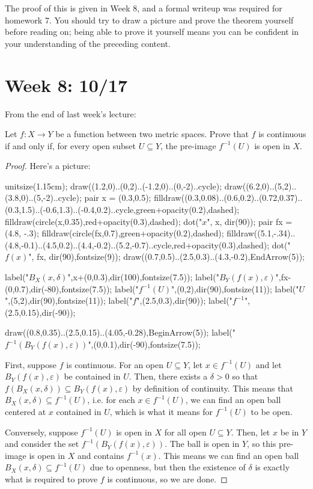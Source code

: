 \documentclass[10pt]{scrartcl}
\providecommand{\eps}{\varepsilon}
\providecommand{\inv}{^{-1}}
\begin{document}
The proof of this is given in Week 8,
and a formal writeup was required for homework 7.
You should try to draw a picture and prove the theorem yourself
before reading on; being able to prove it yourself
means you can be confident in your understanding of the preceding content.

\section{Week 8: 10/17}
From the end of last week's lecture:
\begin{theorem}
	\label{wk8:thm:topocont}
	Let $f\colon X\to Y$ be a function between two metric spaces.
	Prove that $f$ is continuous if and only if,
	for every open subset $U\subseteq Y$, the pre-image
	$f\inv(U)$ is open in $X$.
\end{theorem}

\begin{proof}
	Here's a picture:
	\begin{center}
		\begin{asy}
		unitsize(1.15cm);
		draw((1.2,0)..(0,2)..(-1.2,0)..(0,-2)..cycle);
		draw((6.2,0)..(5,2)..(3.8,0)..(5,-2)..cycle);
		pair x = (0.3,0.5);
		filldraw((0.3,0.08)..(0.6,0.2)..(0.72,0.37)..(0.3,1.5)..(-0.6,1.3)..(-0.4,0.2)..cycle,green+opacity(0.2),dashed);
		filldraw(circle(x,0.35),red+opacity(0.3),dashed);
		dot("$x$", x, dir(90));
		pair fx = (4.8, -.3);
		filldraw(circle(fx,0.7),green+opacity(0.2),dashed);
		filldraw((5.1,-.34)..(4.8,-0.1)..(4.5,0.2)..(4.4,-0.2)..(5.2,-0.7)..cycle,red+opacity(0.3),dashed);
		dot("$f(x)$", fx, dir(90),fontsize(9));
		draw((0.7,0.5)..(2.5,0.3)..(4.3,-0.2),EndArrow(5));
		
		label("$B_X(x,\delta)$",x+(0,0.3),dir(100),fontsize(7.5));
		label("$B_Y(f(x),\varepsilon)$",fx-(0,0.7),dir(-80),fontsize(7.5));
		label("$f^{-1}(U)$",(0,2),dir(90),fontsize(11));
		label("$U$",(5,2),dir(90),fontsize(11));
		label("$f$",(2.5,0.3),dir(90));
		label("$f^{-1}$",(2.5,0.15),dir(-90));
		
		draw((0.8,0.35)..(2.5,0.15)..(4.05,-0.28),BeginArrow(5));
		label("$f^{-1}(B_Y(f(x),\varepsilon))$",(0,0.1),dir(-90),fontsize(7.5));
		\end{asy}
	\end{center}
	
	First, suppose $f$ is continuous.
	For an open $U\subseteq Y$, let $x\in f\inv(U)$
	and let $B_Y(f(x),\eps)$ be contained in $U$.
	Then, there exists a $\delta > 0$ so that
	$f(B_X(x,\delta))\subseteq B_Y(f(x),\eps)$ by definition of continuity.
	This means that $B_X(x,\delta)\subseteq f\inv(U)$, i.e.
	for each $x\in f\inv(U)$, we can find an open ball centered at $x$
	contained in $U$, which is what it means for $f\inv(U)$ to be open.
	
	Conversely, suppose $f\inv(U)$ is open in $X$ for all open $U\subseteq Y$.
	Then, let $x$ be in $Y$ and consider the set $f\inv(B_Y(f(x),\eps))$.
	The ball is open in $Y$, so this pre-image is open in $X$
	and contains $f\inv(x)$. This means we can find an open ball
	$B_X(x,\delta)\subseteq f\inv(U)$ due to openness,
	but then the existence of $\delta$ is exactly what is required
	to prove $f$ is continuous, so we are done.
\end{proof}
\end{document}
